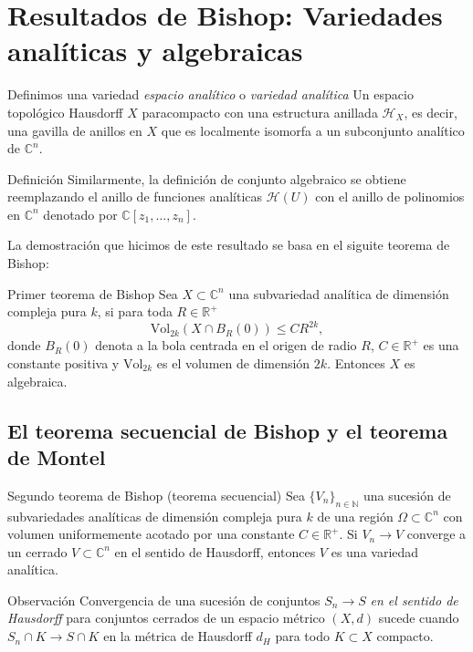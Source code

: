 \documentclass[letterpaper]{beamer}
\newcommand{\nat}{\ensuremath{ \mathbb N }}
\newcommand{\co}{\ensuremath{\mathbb C }}
\newcommand{\con}{\ensuremath{\mathbb{C}^n}}
\newcommand{\re}{\ensuremath{\mathbb R }}
\begin{document}
\section{Resultados de Bishop: Variedades anal\'iticas y algebraicas}
\begin{frame}
  \begin{block}{Definimos una variedad \emph{espacio anal\'itico} o \emph{variedad anal\'itica}}
    Un espacio topol\'ogico Hausdorff $X$ paracompacto con una estructura anillada $\mathcal{H}_X$, es decir, una
    gavilla de anillos en $X$ que es localmente isomorfa a un subconjunto anal\'itico de $\con$.
  \end{block}
  \begin{block}{Definici\'on}
    Similarmente, la definici\'on de conjunto algebraico se obtiene reemplazando el anillo de funciones anal\'iticas $\mathcal{H}(U)$ con el anillo de polinomios en $\con$ denotado por $\co[z_1,\dots,z_n]$.
  \end{block}
\end{frame}
\begin{frame}
    La demostraci\'on que hicimos de este resultado se basa en el siguite teorema de Bishop:\\
      \begin{block}{Primer teorema de Bishop}\label{Bishop1}
        Sea $X\subset\con$ una subvariedad anal\'itica de dimensi\'on compleja pura $k$, si para toda $R\in\re^+$
        $$\textrm{Vol}_{2k}(X\cap B_R(0))\leq CR^{2k},$$
        donde $B_R(0)$ denota a la bola centrada en el origen de radio $R$, $C\in\re^{+}$ es una constante positiva
        y $\textrm{Vol}_{2k}$ es el volumen de dimensi\'on $2k$. Entonces $X$ es algebraica.
      \end{block}
\end{frame}

\subsection{El teorema secuencial de Bishop y el teorema de Montel}
\begin{frame}
      \begin{block}{Segundo teorema de Bishop (teorema secuencial)}\label{Bishop2}
        Sea $\{ V_n \}_{n\in\nat}$ una sucesi\'on de subvariedades anal\'iticas de dimensi\'on compleja pura $k$ de una regi\'on
        $\Omega\subset\con$ con volumen uniformemente acotado por una constante $C\in\re^{+}$.
        Si $V_n\rightarrow V$ converge a un cerrado $V\subset\con$ en el sentido de Hausdorff, entonces $V$ es una
        variedad anal\'itica.
      \end{block}
\begin{block}{Observaci\'on}
      Convergencia de una sucesi\'on de conjuntos $S_n\rightarrow S$ \emph{en el sentido de Hausdorff} para conjuntos cerrados de un espacio m\'etrico $(X,d)$
      sucede cuando $S_n\cap K\rightarrow S\cap K$ en la m\'etrica de Hausdorff $d_H$ para todo $K\subset X$ compacto.
\end{block}
\end{frame}
\end{document}
